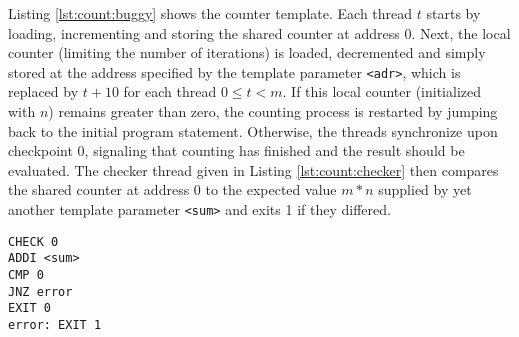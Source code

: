 \vspace{-.1\baselineskip}

Listing \ref{lst:count:buggy} shows the  counter template. %
Each thread $t$ starts by loading, incrementing and storing the shared counter at address 0.
Next, the local counter (limiting the number of iterations) is loaded, decremented and simply stored at the address specified by the template parameter \texttt{<adr>}, which is replaced by $t + 10$ for each thread $0 \leq t < m$.
If this local counter (initialized with $n$) remains greater than zero, the counting process is restarted by jumping back to the initial program statement.
Otherwise, the threads synchronize upon checkpoint 0, signaling that counting has finished and the result should be evaluated.
The checker thread given in Listing \ref{lst:count:checker} then compares the shared counter at address 0 to the expected value $m * n$ supplied by yet another template parameter \texttt{<sum>} and exits 1 if they differed.
\begin{lstlisting}[style=asm, caption={Checker template.}, label={lst:count:checker}, mathescape, xleftmargin=0.39\textwidth]
CHECK 0
ADDI <sum>
CMP 0
JNZ error
EXIT 0
error: EXIT 1
\end{lstlisting}

